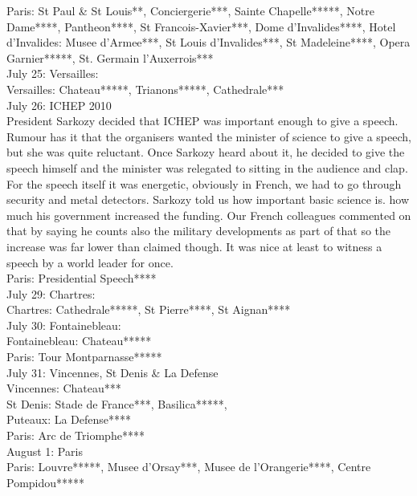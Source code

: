 Paris: St Paul \& St Louis**, Conciergerie***, Sainte Chapelle*****, Notre Dame****, Pantheon****, St Francois-Xavier***, Dome d'Invalides****, Hotel d'Invalides: Musee d'Armee***, St Louis d'Invalides***, St Madeleine****, Opera Garnier*****, St. Germain l'Auxerrois***\\

July 25: Versailles:\\
Versailles: Chateau*****, Trianons*****, Cathedrale***\\

July 26: ICHEP 2010\\
President Sarkozy decided that ICHEP was important enough to give a speech. Rumour has it that the organisers wanted the minister of science to give a speech, but she was quite reluctant. Once Sarkozy heard about it, he decided to give the speech himself and the minister was relegated to sitting in the audience and clap. For the speech itself it was energetic, obviously in French, we had to go through security and metal detectors. Sarkozy told us how important basic science is. how much his government increased the funding. Our French colleagues commented on that by saying he counts also the military developments as part of that so the increase was far lower than claimed though. It was nice at least to witness a speech by a world leader for once.\\

Paris: Presidential Speech****\\

July 29: Chartres:\\
Chartres: Cathedrale*****, St Pierre****, St Aignan****\\

July 30: Fontainebleau:\\
Fontainebleau: Chateau*****\\
Paris: Tour Montparnasse*****\\

July 31: Vincennes, St Denis \& La Defense\\
Vincennes: Chateau***\\
St Denis: Stade de France***, Basilica*****,\\
Puteaux: La Defense****\\
Paris: Arc de Triomphe****\\

August 1: Paris\\
Paris: Louvre*****, Musee d'Orsay***, Musee de l'Orangerie****, Centre Pompidou*****\\

